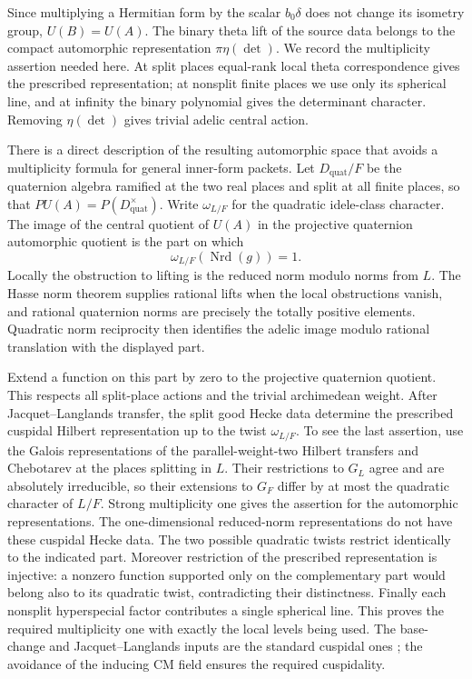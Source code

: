 Since multiplying a Hermitian form by the scalar $b_0\delta$ does not
change its isometry group, $U(B)=U(A)$.  The binary theta lift of the
source data belongs to the compact automorphic representation
$\pi\eta(\det)$.  We record the multiplicity assertion needed here.
At split places equal-rank local theta correspondence gives the
prescribed representation; at nonsplit finite places we use only its
spherical line, and at infinity the binary polynomial gives the
determinant character.  Removing $\eta(\det)$ gives trivial adelic
central action.

There is a direct description of the resulting automorphic space that
avoids a multiplicity formula for general inner-form packets.  Let
$D_{\mathrm{quat}}/F$ be the quaternion algebra ramified at the two real
places and split at all finite places, so that
$PU(A)=P(D_{\mathrm{quat}}^\times)$.  Write $\omega_{L/F}$ for the
quadratic idele-class character.  The image of the central quotient of
$U(A)$ in the projective quaternion automorphic quotient is the part
on which
\[
 \omega_{L/F}(\operatorname{Nrd}(g))=1.
\]
Locally the obstruction to lifting is the reduced norm modulo norms
from $L$.  The Hasse norm theorem supplies rational lifts when the local
obstructions vanish, and rational quaternion norms are precisely the
totally positive elements.  Quadratic norm reciprocity then identifies
the adelic image modulo rational translation with the displayed part.

Extend a function on this part by zero to the projective quaternion
quotient.  This respects all split-place actions and the trivial
archimedean weight.  After Jacquet--Langlands transfer, the split good
Hecke data determine the prescribed cuspidal Hilbert representation up
to the twist $\omega_{L/F}$.  To see the last assertion, use the Galois
representations of the parallel-weight-two Hilbert transfers
\cite[Theorem~1.1 and Remark~1.2]{Newton2015} and Chebotarev at the
places splitting in $L$.  Their restrictions to $G_L$
agree and are absolutely irreducible, so their extensions to $G_F$
differ by at most the quadratic character of $L/F$.  Strong multiplicity
one gives the assertion for the automorphic representations.  The
one-dimensional reduced-norm representations do not have these
cuspidal Hecke data.  The two possible quadratic twists restrict
identically to the indicated part.  Moreover restriction of the
prescribed representation is injective: a nonzero function supported
only on the complementary part would belong also to its quadratic
twist, contradicting their distinctness.  Finally each nonsplit
hyperspecial factor contributes a single spherical line.  This proves
the required multiplicity one with exactly the local levels being
used.  The base-change and Jacquet--Langlands inputs are the standard
cuspidal ones \cite{ArthurClozel1989,JacquetLanglands1970}; the avoidance
of the inducing CM field ensures the required cuspidality.

